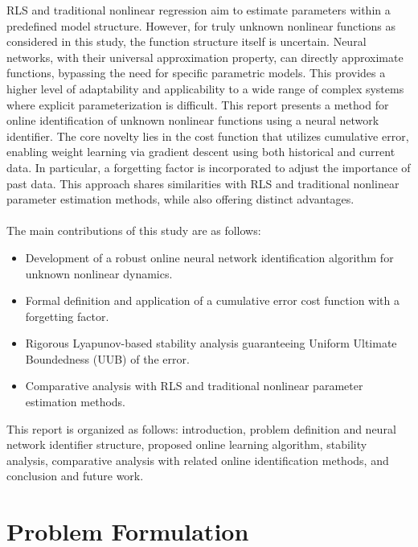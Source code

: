 \documentclass[10pt,twocolumn]{ICCAS}
\begin{document}
{    RLS and traditional nonlinear regression aim to estimate parameters within a predefined model structure. However, for truly unknown nonlinear functions as considered in this study, the function structure itself is uncertain. Neural networks, with their universal approximation property, can directly approximate functions, bypassing the need for specific parametric models. This provides a higher level of adaptability and applicability to a wide range of complex systems where explicit parameterization is difficult.
    This report presents a method for online identification of unknown nonlinear functions using a neural network identifier. The core novelty lies in the cost function that utilizes cumulative error, enabling weight learning via gradient descent using both historical and current data. In particular, a forgetting factor is incorporated to adjust the importance of past data. This approach shares similarities with RLS and traditional nonlinear parameter estimation methods, while also offering distinct advantages.
    \\ \\
    The main contributions of this study are as follows:
    \begin{itemize}
        \item Development of a robust online neural network identification algorithm for unknown nonlinear dynamics.
        \item Formal definition and application of a cumulative error cost function with a forgetting factor.
        \item Rigorous Lyapunov-based stability analysis guaranteeing Uniform Ultimate Boundedness (UUB) of the error.
        \item Comparative analysis with RLS and traditional nonlinear parameter estimation methods.
    \end{itemize}
    This report is organized as follows: introduction, problem definition and neural network identifier structure, proposed online learning algorithm, stability analysis, comparative analysis with related online identification methods, and conclusion and future work.
}
\section{Problem Formulation}
\end{document}
